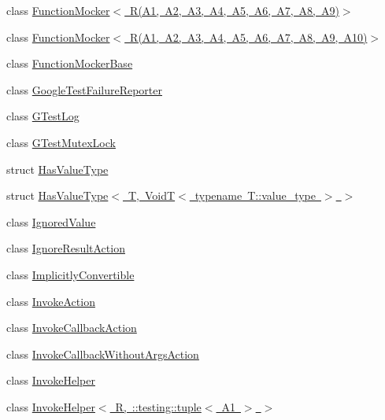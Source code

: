 \begin{DoxyCompactItemize}
\item 
class \mbox{\hyperlink{classtesting_1_1internal_1_1FunctionMocker_3_01R_07A1_00_01A2_00_01A3_00_01A4_00_01A5_00_01A6_00_01A7_00_01A8_00_01A9_08_4}{Function\+Mocker$<$ R(\+A1, A2, A3, A4, A5, A6, A7, A8, A9)$>$}}
\item 
class \mbox{\hyperlink{classtesting_1_1internal_1_1FunctionMocker_3_01R_07A1_00_01A2_00_01A3_00_01A4_00_01A5_00_01A6_0079295c90ba14a714e84d5a856a5b50dd}{Function\+Mocker$<$ R(\+A1, A2, A3, A4, A5, A6, A7, A8, A9, A10)$>$}}
\item 
class \mbox{\hyperlink{classtesting_1_1internal_1_1FunctionMockerBase}{Function\+Mocker\+Base}}
\item 
class \mbox{\hyperlink{classtesting_1_1internal_1_1GoogleTestFailureReporter}{Google\+Test\+Failure\+Reporter}}
\item 
class \mbox{\hyperlink{classtesting_1_1internal_1_1GTestLog}{G\+Test\+Log}}
\item 
class \mbox{\hyperlink{classtesting_1_1internal_1_1GTestMutexLock}{G\+Test\+Mutex\+Lock}}
\item 
struct \mbox{\hyperlink{structtesting_1_1internal_1_1HasValueType}{Has\+Value\+Type}}
\item 
struct \mbox{\hyperlink{structtesting_1_1internal_1_1HasValueType_3_01T_00_01VoidT_3_01typename_01T_1_1value__type_01_4_01_4}{Has\+Value\+Type$<$ T, Void\+T$<$ typename T\+::value\+\_\+type $>$ $>$}}
\item 
class \mbox{\hyperlink{classtesting_1_1internal_1_1IgnoredValue}{Ignored\+Value}}
\item 
class \mbox{\hyperlink{classtesting_1_1internal_1_1IgnoreResultAction}{Ignore\+Result\+Action}}
\item 
class \mbox{\hyperlink{classtesting_1_1internal_1_1ImplicitlyConvertible}{Implicitly\+Convertible}}
\item 
class \mbox{\hyperlink{classtesting_1_1internal_1_1InvokeAction}{Invoke\+Action}}
\item 
class \mbox{\hyperlink{classtesting_1_1internal_1_1InvokeCallbackAction}{Invoke\+Callback\+Action}}
\item 
class \mbox{\hyperlink{classtesting_1_1internal_1_1InvokeCallbackWithoutArgsAction}{Invoke\+Callback\+Without\+Args\+Action}}
\item 
class \mbox{\hyperlink{classtesting_1_1internal_1_1InvokeHelper}{Invoke\+Helper}}
\item 
class \mbox{\hyperlink{classtesting_1_1internal_1_1InvokeHelper_3_01R_00_01_1_1testing_1_1tuple_3_01A1_01_4_01_4}{Invoke\+Helper$<$ R, \+::testing\+::tuple$<$ A1 $>$ $>$}}

\end{DoxyCompactItemize}
